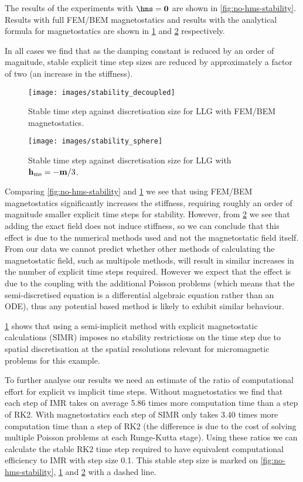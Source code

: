 The results of the experiments with $\hms = \zerov$ are shown in \cref{fig:no-hms-stability}.
Results with full FEM/BEM magnetostatics and results with the analytical formula for magnetostatics are shown in \cref{fig:hms-stability} and \ref{fig:analytic-hms-stability} respectively.

In all cases we find that as the damping constant is reduced by an order of magnitude, stable explicit time step sizes are reduced by approximately a factor of two (\ie an increase in the stiffness).

\begin{figure}
  \centering
  \texttt{[image: images/stability\_decoupled]}
  \caption{Stable time step against discretisation size for LLG with FEM/BEM magnetostatics.}
  \label{fig:hms-stability}
\end{figure}


\begin{figure}
  \centering
  \texttt{[image: images/stability\_sphere]}
  \caption{Stable time step against discretisation size for LLG with $\boldsymbol{\mathrm{h}}_{\text{ms}} = - \boldsymbol{\mathrm{m}} / 3$.
  }
  \label{fig:analytic-hms-stability}
\end{figure}

Comparing \cref{fig:no-hms-stability} and \ref{fig:hms-stability} we see that using FEM/BEM magnetostatics significantly increases the stiffness, requiring roughly an order of magnitude smaller explicit time steps for stability.
However, from \cref{fig:analytic-hms-stability} we see that adding the exact field does not induce stiffness, so we can conclude that this effect is due to the numerical methods used and not the magnetostatic field itself.
From our data we cannot predict whether other methods of calculating the magnetostatic field, such as multipole methods, will result in similar increases in the number of explicit time steps required.
However we expect that the effect is due to the coupling with the additional Poisson problems (which means that the semi-discretised equation is a differential algebraic equation \cite[371]{HairerWanner} rather than an ODE), thus any potential based method is likely to exhibit similar behaviour.

\cref{fig:hms-stability} shows that using a semi-implicit method with explicit magnetostatic calculations (SIMR) imposes no stability restrictions on the time step due to spatial discretisation at the spatial resolutions relevant for micromagnetic problems for this example.

To further analyse our results we need an estimate of the ratio of computational effort for explicit vs implicit time steps. Without magnetostatics we find that each step of IMR takes on average 5.86 times more computation time than a step of RK2. With magnetostatics each step of SIMR only takes 3.40 times more computation time than a step of RK2 (the difference is due to the cost of solving multiple Poisson problems at each Runge-Kutta stage). Using these ratios we can calculate the stable RK2 time step required to have equivalent computational efficiency to IMR with step size 0.1. This stable step size is marked on \cref{fig:no-hms-stability}, \ref{fig:hms-stability} and \ref{fig:analytic-hms-stability} with a dashed line.


